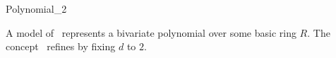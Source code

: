 \begin{ccRefConcept}{Polynomial_2}

\ccDefinition

A model of \ccRefName\ represents a bivariate polynomial over some basic ring 
$R$. The concept \ccRefName\ refines  by fixing $d$ to $2$.

\ccRefines

\\

\ccSeeAlso 

\\
\\
\\

\ccHasModels

\end{ccRefConcept}